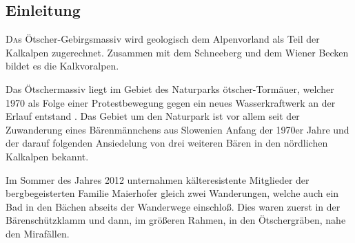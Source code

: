\documentclass[twoside]{article}
\begin{document}
\begin{multicols}{2} %

\section{Einleitung}

\lettrine[nindent=0em,lines=3]{D} as Ötscher-Gebirgsmassiv wird geologisch dem Alpenvorland als Teil der
Kalkalpen zugerechnet. Zusammen mit dem Schneeberg und dem Wiener Becken bildet es die Kalkvoralpen. \cite{SH:2012}

Das Ötschermassiv liegt im Gebiet des Naturparks ötscher-Tormäuer, welcher 1970 als Folge einer Protestbewegung gegen ein neues Wasserkraftwerk an der Erlauf
entstand \cite{NOT:2013:Online}. Das Gebiet um den Naturpark ist vor allem seit der Zuwanderung eines Bärenmännchens aus Slowenien Anfang der 1970er Jahre und
der darauf folgenden Ansiedelung von drei weiteren Bären in den nördlichen Kalkalpen bekannt.

Im Sommer des Jahres 2012 unternahmen kälteresistente Mitglieder der bergbegeisterten Familie Maierhofer gleich zwei Wanderungen, welche auch ein Bad in den
Bächen abseits der Wanderwege einschloß. Dies waren zuerst in der Bärenschützklamm und dann, im größeren Rahmen, in den Ötschergräben, nahe den Mirafällen.



\end{multicols}
\end{document}
